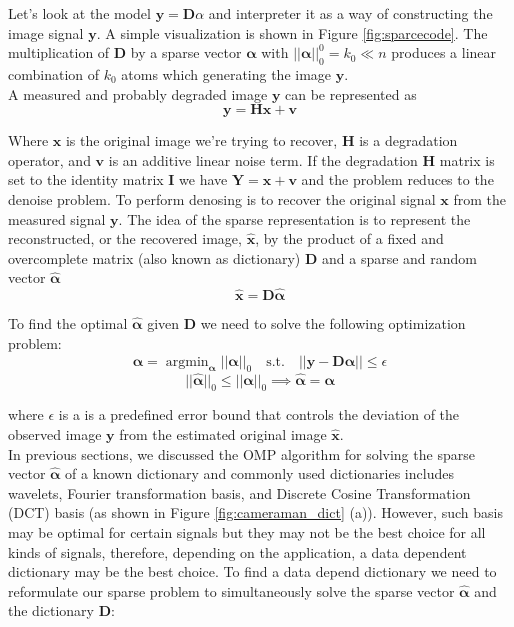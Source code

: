 \documentclass[12pt,letterpaper]{article}
\DeclareMathOperator*{\argmin}{argmin}
\begin{document}
Let's look at the model $\bm{y}=\bm{D}\alpha$ and interpreter it as a way of constructing the image signal $\bm{y}.$ A simple visualization is shown in Figure \ref{fig:sparcecode}. The multiplication of $\bm{D}$ by a sparse vector $\bm{\alpha}$ with $||\bm{\alpha}||_0^0 = k_0 \ll n$ produces a linear combination of $k_0$ atoms which generating the image $\bm{y}.$  
\\

A measured and probably degraded image $\bm{y}$ can be represented as
 \[ 
 \bm{y}=\bm{Hx}+\bm{v}
 \]


Where $\bm{x}$ is the original image we're trying to recover, $\bm{H}$ is a degradation operator, and $\bm{v}$ is an additive linear noise term. If the degradation $\bm{H}$ matrix is set to the identity matrix $\bm{I}$ we have  $\bm{Y} = \bm{x} + \bm{v}$ and the problem reduces to the denoise problem.  To perform denosing is to recover the original signal $\bm{x}$ from the measured signal $\bm{y}$. The idea of the sparse representation is to represent the reconstructed, or the recovered image, $\hat{\bm{x}}$, by the product of a fixed and overcomplete matrix (also known as dictionary) $\bm{D}$ and a sparse and random vector $\bm{\hat{\alpha}}$
\[
    \hat{\bm{x}} = \bm{D}\hat{\bm{\alpha}} 
\]

To find the optimal $\bm{\hat{\alpha}}$ given $\bm{D}$ we need to solve the following optimization problem:
\[
    \hat{\bm{\alpha}} = \argmin_{\bm{\alpha}}||\bm{\alpha}||_0 \quad
    \textrm{s.t.} \quad
    ||\bm{y}-\bm{D}\bm{\alpha}||\le \epsilon
\]
\[
    ||\hat{\bm{\alpha}}||_0 \le||\bm{\alpha}||_0 \implies \hat{\bm{\alpha}} = \bm{\alpha}
\]

where ${\epsilon}$ is a is a predefined error bound that controls the deviation of the observed image $\bm{y}$ from the estimated original image $\hat{\bm{x}}$. 
\\

In previous sections, we discussed the OMP algorithm for solving the sparse vector $\hat{\bm{\alpha}}$ of a known dictionary and commonly used dictionaries includes wavelets, Fourier transformation basis, and Discrete Cosine Transformation (DCT) basis (as shown in Figure \ref{fig:cameraman_dict} (a)). However, such basis may be optimal for certain signals but they may not be the best choice for all kinds of signals, therefore, depending on the application, a data dependent dictionary may be the best choice.  To find a data depend dictionary we need to reformulate our sparse problem to simultaneously solve the sparse vector $\hat{\bm{\alpha}}$ and the dictionary $\bm{D}$:  
\end{document}
